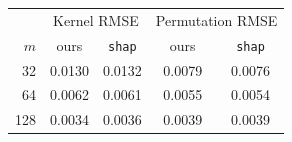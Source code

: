 \begin{tabular}{r|cc|cc}
\toprule
& \multicolumn{2}{c|}{Kernel RMSE} & \multicolumn{2}{c}{Permutation RMSE}\\
$m$ & ours & \texttt{shap} & ours & \texttt{shap}\\
\midrule
32 & 0.0130 & 0.0132 & 0.0079 & 0.0076\\
64 & 0.0062 & 0.0061 & 0.0055 & 0.0054\\
128 & 0.0034 & 0.0036 & 0.0039 & 0.0039\\
\bottomrule
\end{tabular}
